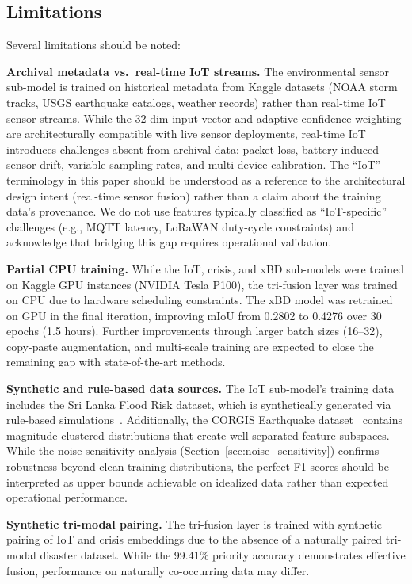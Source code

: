 \documentclass[journal]{IEEEtran}
\begin{document}
\subsection{Limitations}
\label{sec:limitations}

Several limitations should be noted:

\textbf{Archival metadata vs.\ real-time IoT streams.} The environmental sensor sub-model is trained on historical metadata from Kaggle datasets (NOAA storm tracks, USGS earthquake catalogs, weather records) rather than real-time IoT sensor streams. While the 32-dim input vector and adaptive confidence weighting are architecturally compatible with live sensor deployments, real-time IoT introduces challenges absent from archival data: packet loss, battery-induced sensor drift, variable sampling rates, and multi-device calibration. The ``IoT'' terminology in this paper should be understood as a reference to the architectural design intent (real-time sensor fusion) rather than a claim about the training data's provenance. We do not use features typically classified as ``IoT-specific'' challenges (e.g., MQTT latency, LoRaWAN duty-cycle constraints) and acknowledge that bridging this gap requires operational validation.

\textbf{Partial CPU training.} While the IoT, crisis, and xBD sub-models were trained on Kaggle GPU instances (NVIDIA Tesla P100), the tri-fusion layer was trained on CPU due to hardware scheduling constraints. The xBD model was retrained on GPU in the final iteration, improving mIoU from 0.2802 to 0.4276 over 30 epochs (1.5 hours). Further improvements through larger batch sizes (16--32), copy-paste augmentation, and multi-scale training are expected to close the remaining gap with state-of-the-art methods.

\textbf{Synthetic and rule-based data sources.} The IoT sub-model's training data includes the Sri Lanka Flood Risk dataset, which is synthetically generated via rule-based simulations~\cite{kaggle_srilanka_flood}. Additionally, the CORGIS Earthquake dataset~\cite{corgis_eq} contains magnitude-clustered distributions that create well-separated feature subspaces. While the noise sensitivity analysis (Section~\ref{sec:noise_sensitivity}) confirms robustness beyond clean training distributions, the perfect F1 scores should be interpreted as upper bounds achievable on idealized data rather than expected operational performance.

\textbf{Synthetic tri-modal pairing.} The tri-fusion layer is trained with synthetic pairing of IoT and crisis embeddings due to the absence of a naturally paired tri-modal disaster dataset. While the 99.41\% priority accuracy demonstrates effective fusion, performance on naturally co-occurring data may differ.
\end{document}
